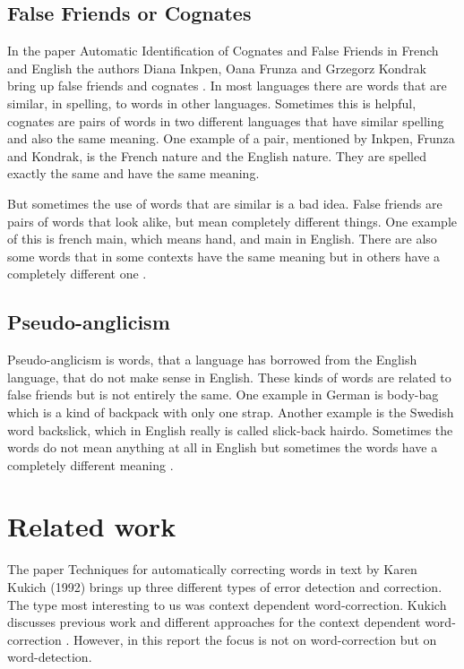 \documentclass[a4paper,12pt]{article}
\begin{document}
\subsection{False Friends or Cognates}
In the paper Automatic Identification of Cognates and False Friends in French and English the authors Diana Inkpen, Oana Frunza and Grzegorz Kondrak bring up false friends and cognates \cite{frunzaInkpen2009identification}. In most languages there are words that are similar, in spelling, to words in other languages. Sometimes this is helpful, cognates are pairs of words in two different languages that have similar spelling and also the same meaning. One example of a pair, mentioned by Inkpen, Frunza and Kondrak, is the French nature and the English nature. They are spelled exactly the same and have the same meaning.

But sometimes the use of words that are similar is a bad idea. False friends are pairs of words that look alike, but mean completely different things. One example of this is french main, which means hand, and main in English. There are also some words that in some contexts have the same meaning but in others have a completely different one \cite{frunzaInkpen2009identification}.

\subsection{Pseudo-anglicism}
Pseudo-anglicism is words, that a language has borrowed from the English language, that do not make sense in English. These kinds of words are related to false friends but is not entirely the same. One example in German is body-bag which is a kind of backpack with only one strap. Another example is the Swedish word backslick, which in English really is called slick-back hairdo. Sometimes the words do not mean anything at all in English but sometimes the words have a completely different meaning \cite{pseudoanglicism}.

\section{Related work}
\label{sec:relatedwork}
The paper Techniques for automatically correcting words in text by Karen Kukich (1992) brings up three different types of error detection and correction. The type most interesting to us was context dependent word-correction. Kukich discusses previous work and different approaches for the context dependent word-correction \cite{Kukich1992Tecniques}. However, in this report the focus is not on word-correction but on word-detection.
\end{document}
